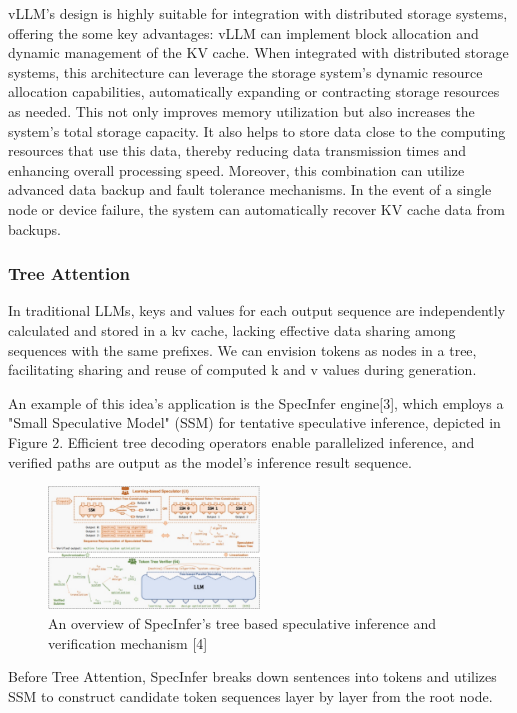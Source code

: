 \documentclass[conference]{IEEEtran}
\begin{document}
vLLM's design is highly suitable for integration with distributed storage systems, offering the some key advantages: vLLM can implement block allocation and dynamic management of the KV cache. When integrated with distributed storage systems, this architecture can leverage the storage system's dynamic resource allocation capabilities, automatically expanding or contracting storage resources as needed. This not only improves memory utilization but also increases the system's total storage capacity. It also helps to store data close to the computing resources that use this data, thereby reducing data transmission times and enhancing overall processing speed. Moreover, this combination can utilize advanced data backup and fault tolerance mechanisms. In the event of a single node or device failure, the system can automatically recover KV cache data from backups.


\subsubsection{Tree Attention}
In traditional LLMs, keys and values for each output sequence are independently calculated and stored in a kv cache, lacking effective data sharing among sequences with the same prefixes. We can envision tokens as nodes in a tree, facilitating sharing and reuse of computed k and v values during generation.

An example of this idea's application is the SpecInfer engine[3], which employs a "Small Speculative Model" (SSM) for tentative speculative inference, depicted in Figure 2. Efficient tree decoding operators enable parallelized inference, and verified paths are output as the model's inference result sequence.

\begin{figure}[htbp]
    \centerline{\includegraphics[width=0.5\textwidth]{process figM2.png}}
    \caption{An overview of SpecInfer's tree based speculative inference and verification mechanism [4]}
    \label{fig}
\end{figure}

Before Tree Attention, SpecInfer breaks down sentences into tokens and utilizes SSM to construct candidate token sequences layer by layer from the root node.
\end{document}
